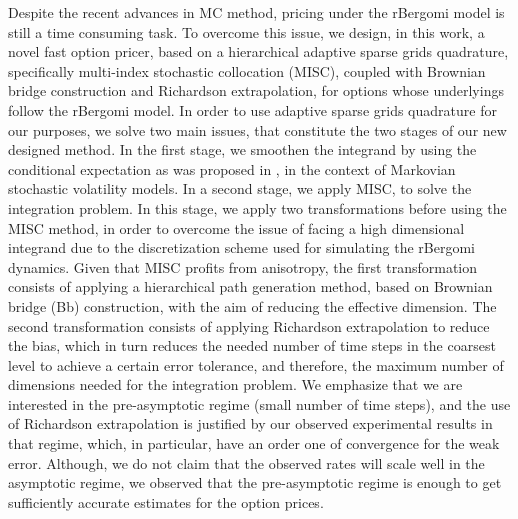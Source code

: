 Despite the recent advances in MC method, pricing under the rBergomi model is still a time consuming task. To overcome this issue,  we design,  in this work,  a novel fast option pricer,  based on a  hierarchical adaptive sparse grids quadrature, specifically  multi-index stochastic collocation (MISC), coupled with Brownian bridge construction and Richardson extrapolation, for options whose underlyings  follow the rBergomi model.  In order to use adaptive sparse grids quadrature for our purposes, we  solve two main issues, that constitute the two stages of our new designed method. In the first stage, we smoothen the integrand by using the conditional expectation as was proposed in \cite{romano1997contingent}, in the context of Markovian stochastic volatility  models.   In a second stage, we apply  MISC, to solve the integration problem. In this stage, we apply two transformations before using the MISC method, in order to overcome the issue of facing a high dimensional integrand due to the discretization scheme used for simulating the rBergomi dynamics. Given that MISC profits from anisotropy, the first transformation consists of applying a hierarchical  path generation method, based on Brownian
bridge (Bb) construction, with the aim of reducing the effective dimension. The second transformation consists of applying Richardson extrapolation to reduce the bias, which in turn reduces the needed number of time steps in the coarsest level to achieve a certain error tolerance, and therefore,  the maximum number of dimensions needed for the integration problem. We emphasize that we are interested in  the pre-asymptotic regime (small number of time steps), and  the use of Richardson extrapolation is justified by our observed experimental results in that regime,  which, in particular, have  an order one of convergence for the weak error. Although, we do not claim that the observed rates will scale well in the asymptotic regime, we observed that the pre-asymptotic regime is enough to get sufficiently accurate estimates for the option prices. 

